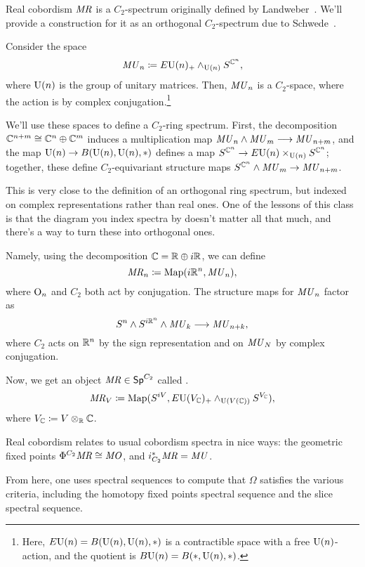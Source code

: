 \begin{defn}
\label{MRdefn}
Real cobordism $\mathit{MR}$ is a $C_2$-spectrum originally defined by Landweber~\cite{LandweberMR}. We'll provide a
construction for it as an orthogonal $C_2$-spectrum due to Schwede~\cite{SchwedeEquivariant}.

Consider the space
\[\mathit{MU}_n\coloneqq E\mathrm U(n)_+\wedge_{\mathrm U(n)} S^{\mathbb C^n},\]
where $\mathrm U(n)$ is the group of unitary matrices. Then, $\mathit{MU}_n$ is a $C_2$-space, where the action is by complex
conjugation.\footnote{Here, $E\mathrm U(n) = B(\mathrm U(n), \mathrm U(n), *)$ is a contractible space with a free $\mathrm U(n)$-action, and
the quotient is $B\mathrm U(n) = B(*, \mathrm U(n), *)$.}

We'll use these spaces to define a $C_2$-ring spectrum. First, the decomposition $\mathbb C^{n+m}\cong\mathbb C^n\oplus\mathbb C^m$
induces a multiplication map $\mathit{MU}_n\wedge\mathit{MU}_m\longrightarrow \mathit{MU}_{n+m}$, and the map $\mathrm U(n)\to B(\mathrm U(n), \mathrm U(n), *)$
defines a map $S^{\mathbb C^n}\to E\mathrm U(n)\times_{\mathrm U(n)} S^{\mathbb C^n}$; together, these define $C_2$-equivariant structure maps
$S^{\mathbb C^n}\wedge\mathit{MU}_m\to \mathit{MU}_{n+m}$.

This is very close to the definition of an orthogonal ring spectrum, but indexed on complex representations rather
than real ones. One of the lessons of this class is that the diagram you index spectra by doesn't matter all that
much, and there's a way to turn these  into orthogonal ones.

Namely, using the decomposition $\mathbb C = \mathbb R\oplus i\mathbb R$, we can define
\[\mathit{MR}_n\coloneqq \operatorname{Map}(i\mathbb R^n, \mathit{MU}_n),\]
where $\mathrm O_n$ and $C_2$ both act by conjugation. The structure maps for $\mathit{MU}_n$ factor as
\[S^n\wedge S^{i\mathbb R^n}\wedge\mathit{MU}_k\longrightarrow \mathit{MU}_{n+k},\]
where $C_2$ acts on $\mathbb R^n$ by the sign representation and on $\mathit{MU}_N$ by complex conjugation.

Now, we get an object $\mathit{MR}\in\mathsf{Sp}^{C_2}$ called .
\[\mathit{MR}_V \coloneqq \operatorname{Map}(S^{iV}, E\mathrm U(V_\mathbb C)_+\wedge_{\mathrm U(V(\mathbb C))}S^{V_\mathbb C}),\]
where $V_\mathbb C\coloneqq V\otimes_\mathbb R\mathbb C$.
\end{defn}
Real cobordism relates to usual cobordism spectra in nice ways: the geometric fixed points
$\Phi^{C_2}\mathit{MR}\cong\mathit{MO}$, and $i_{C_2}^*\mathit{MR} = \mathit{MU}$.

From here, one uses spectral sequences to compute that $\Omega$ satisfies the various criteria, including the
homotopy fixed points spectral sequence and the slice spectral sequence.
